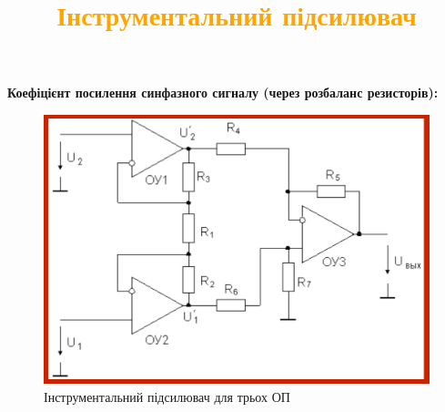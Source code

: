 \documentclass[aspectratio=169]{beamer}
\begin{document}
{
\title{\textcolor{orange}{Інструментальний підсилювач}}
\begin{frame}
\textbf {Коефіцієнт посилення синфазного сигналу (через розбаланс резисторів):}\\
\begin{figure}[!ht]
\begin{center}
\includegraphics[scale=0.2]{33op.jpg}
\caption{Інструментальний підсилювач для трьох ОП}
\end{center}
\end{figure}
\end{frame}
}
\end{document}
